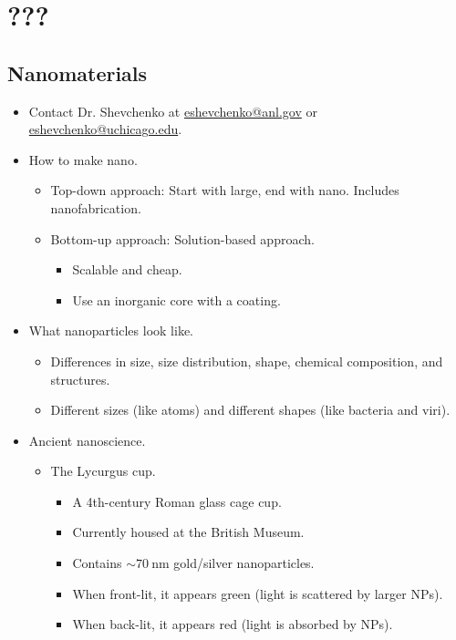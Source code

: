 \documentclass[../notes.tex]{subfiles}
\begin{document}
\chapter{???}
\section{Nanomaterials}
\begin{itemize}
    \item {}Contact Dr. Shevchenko at \href{mailto:eshevchenko@anl.gov}{eshevchenko@anl.gov} or \href{mailto:eshevchenko@uchicago.edu}{eshevchenko@uchicago.edu}.
    \item How to make nano.
    \begin{itemize}
        \item Top-down approach: Start with large, end with nano. Includes nanofabrication.
        \item Bottom-up approach: Solution-based approach.
        \begin{itemize}
            \item Scalable and cheap.
            \item Use an inorganic core with a coating.
        \end{itemize}
    \end{itemize}
    \item What nanoparticles look like.
    \begin{itemize}
        \item Differences in size, size distribution, shape, chemical composition, and structures.
        \item Different sizes (like atoms) and different shapes (like bacteria and viri).
    \end{itemize}
    \item Ancient nanoscience.
    \begin{itemize}
        \item The Lycurgus cup.
        \begin{itemize}
            \item A 4th-century Roman glass cage cup.
            \item Currently housed at the British Museum.
            \item Contains $\sim\SI{70}{\nano\meter}$ gold/silver nanoparticles.
            \item When front-lit, it appears green (light is scattered by larger NPs).
            \item When back-lit, it appears red (light is absorbed by NPs).

\end{itemize}
\end{itemize}
\end{itemize}
\end{document}
